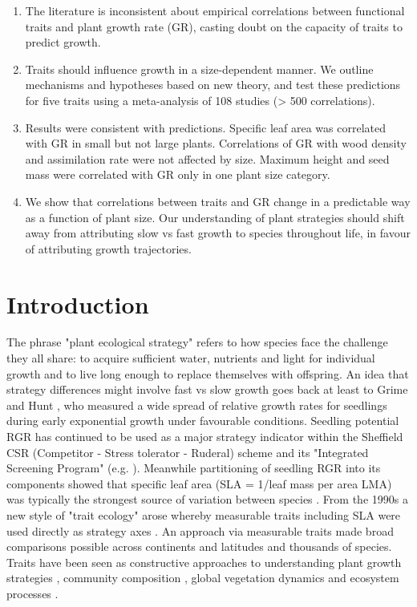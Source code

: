 \documentclass[a4paper]{article}\usepackage[]{graphicx}\usepackage[]{color}
\begin{document}
\begin{enumerate}

\item
The literature is inconsistent about empirical correlations between functional traits and plant growth rate (GR), casting doubt on the capacity of traits to predict growth.

\item
Traits should influence growth in a size-dependent manner. We outline mechanisms and hypotheses based on new theory, and test these predictions for five traits using a meta-analysis of 108 studies (\textgreater{} 500 correlations).

\item
Results were consistent with predictions. Specific leaf area was correlated with GR in small but not large plants. Correlations of GR with wood density and assimilation rate were not affected by size. Maximum height and seed mass were correlated with GR only in one plant size category.

\item
We show that correlations between traits and GR change in a predictable way as a function of plant size. Our understanding of plant strategies should shift away from attributing slow vs fast growth to species throughout life, in favour of attributing growth trajectories.


\end{enumerate}


\section*{Introduction}\label{introduction}


The phrase "plant ecological strategy" refers to how species face the challenge they all share:  to acquire sufficient water, nutrients and light for individual growth and to live long enough to replace themselves with offspring. An idea that strategy differences might involve fast vs slow growth goes back at least to Grime and Hunt \citeyearpar{Grime:1975gr}, who measured a wide spread of relative growth rates for seedlings during early exponential growth under favourable conditions. Seedling potential RGR has continued to be used as a major strategy indicator within the Sheffield CSR (Competitor - Stress tolerator - Ruderal) scheme and its "Integrated Screening Program" (e.g. \citealt{grime1979plant, Grime:1997wm}). Meanwhile partitioning of seedling RGR into its components showed that specific leaf area (SLA = 1/leaf mass per area LMA) was typically the strongest source of variation between species \citep{Poorter:1989tx}. From the 1990s a new style of "trait ecology" arose whereby measurable traits including SLA were used directly as strategy axes \citep{Westoby:2002ft}. An approach via measurable traits made broad comparisons possible across continents and latitudes and thousands of species. Traits have been seen as constructive approaches to understanding plant growth strategies \citep{Grime:1977kc,Chapin:1980gz}, community composition \citep{Lavorel:2002ff,Shipley:2006ie}, global vegetation dynamics \citep{Scheiter:2013ed} and ecosystem processes \citep{Lavorel:2002ff}.
\end{document}

